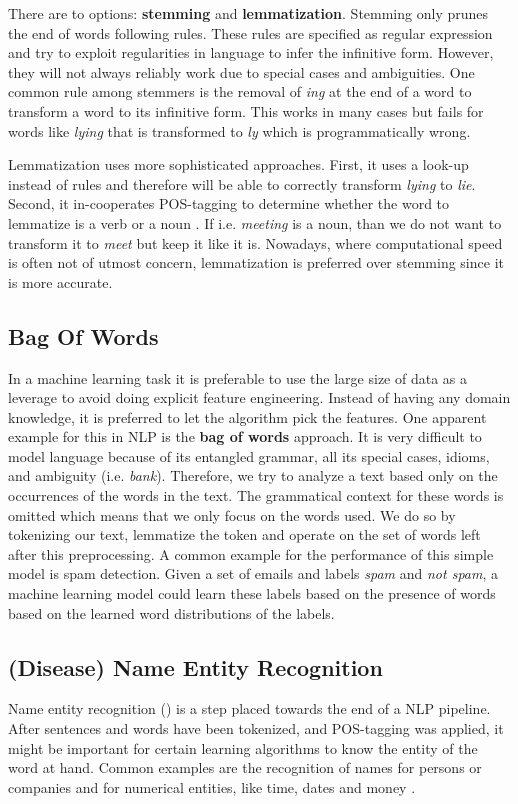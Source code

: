 There are to options: \textbf{stemming} and \textbf{lemmatization}. Stemming only prunes the end of words following rules. These rules are specified as regular expression and try to exploit regularities in language to infer the infinitive form. However, they will not always reliably work due to special cases and ambiguities. One common rule among stemmers is the removal of \textit{ing} at the end of a word to transform a word to its infinitive form. This works in many cases but fails for words like \textit{lying} that is transformed to \textit{ly} which is programmatically wrong.

Lemmatization uses more sophisticated approaches. First, it uses a look-up instead of rules and therefore will be able to correctly transform \textit{lying} to \textit{lie}. Second, it in-cooperates POS-tagging to determine whether the word to lemmatize is a verb or a noun \citep{Muller2015}. If i.e. \textit{meeting} is a noun, than we do not want to transform it to \textit{meet} but keep it like it is. Nowadays, where computational speed is often not of utmost concern, lemmatization is preferred over stemming since it is more accurate\cite{Balakrishnan2014}.


\subsection{Bag Of Words}
In a machine learning task it is preferable to use the large size of data as a leverage to avoid doing explicit feature engineering. Instead of having any domain knowledge, it is preferred to let the algorithm pick the features. One apparent example for this in NLP is the \textbf{bag of words} approach. It is very difficult to model language because of its entangled grammar, all its special cases, idioms, and ambiguity (i.e. \textit{bank}). Therefore, we try to analyze a text based only on the occurrences of the words in the text. The grammatical context for these words is omitted which means that we only focus on the words used. We do so by tokenizing our text, lemmatize the token and operate on the set of words left after this preprocessing. A common example for the performance of this simple model is spam detection. Given a set of emails and labels \emph{spam} and \emph{not spam}, a machine learning model could learn these labels based on the presence of words based on the learned word distributions of the labels.

\subsection{(Disease) Name Entity Recognition}
Name entity recognition () is a step placed towards the end of a NLP pipeline. After sentences and words have been tokenized, and POS-tagging was applied, it might be important for certain learning algorithms to
know the entity of the word at hand. Common examples are the recognition of names for persons or companies and for numerical entities, like time, dates and money \citep{Nadeau2009}.

